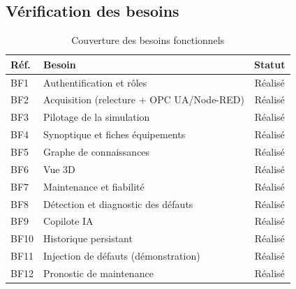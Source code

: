 \subsection{Vérification des besoins}
\begin{table}[H]
\centering
\caption{Couverture des besoins fonctionnels}
\label{tab:couverture}
\begin{tabular}{llc}
\toprule
\textbf{Réf.} & \textbf{Besoin} & \textbf{Statut} \\
\midrule
BF1 & Authentification et rôles & Réalisé \\
BF2 & Acquisition (relecture + OPC UA/Node-RED) & Réalisé \\
BF3 & Pilotage de la simulation & Réalisé \\
BF4 & Synoptique et fiches équipements & Réalisé \\
BF5 & Graphe de connaissances & Réalisé \\
BF6 & Vue 3D & Réalisé \\
BF7 & Maintenance et fiabilité & Réalisé \\
BF8 & Détection et diagnostic des défauts & Réalisé \\
BF9 & Copilote IA & Réalisé \\
BF10 & Historique persistant & Réalisé \\
BF11 & Injection de défauts (démonstration) & Réalisé \\
BF12 & Pronostic de maintenance & Réalisé \\
\bottomrule
\end{tabular}
\end{table}

